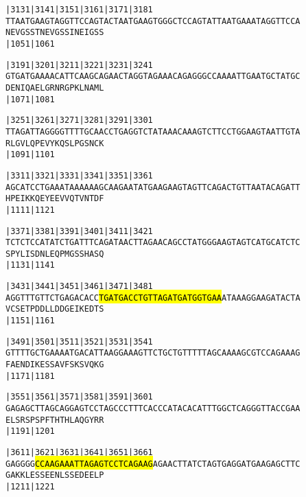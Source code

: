 \documentclass{article}
\begin{document}
\newpage
\begin{alltt}
|3131     |3141     |3151     |3161     |3171     |3181     
TTAATGAAGTAGGTTCCAGTACTAATGAAGTGGGCTCCAGTATTAATGAAATAGGTTCCA
  N  E  V  G  S  S  T  N  E  V  G  S  S  I  N  E  I  G  S  S
                    |1051                         |1061     

|3191     |3201     |3211     |3221     |3231     |3241     
GTGATGAAAACATTCAAGCAGAACTAGGTAGAAACAGAGGGCCAAAATTGAATGCTATGC
  D  E  N  I  Q  A  E  L  G  R  N  R  G  P  K  L  N  A  M  L
                    |1071                         |1081     

|3251     |3261     |3271     |3281     |3291     |3301     
TTAGATTAGGGGTTTTGCAACCTGAGGTCTATAAACAAAGTCTTCCTGGAAGTAATTGTA
  R  L  G  V  L  Q  P  E  V  Y  K  Q  S  L  P  G  S  N  C  K
                    |1091                         |1101     

|3311     |3321     |3331     |3341     |3351     |3361     
AGCATCCTGAAATAAAAAAGCAAGAATATGAAGAAGTAGTTCAGACTGTTAATACAGATT
  H  P  E  I  K  K  Q  E  Y  E  E  V  V  Q  T  V  N  T  D  F
                    |1111                         |1121     

|3371     |3381     |3391     |3401     |3411     |3421     
TCTCTCCATATCTGATTTCAGATAACTTAGAACAGCCTATGGGAAGTAGTCATGCATCTC
  S  P  Y  L  I  S  D  N  L  E  Q  P  M  G  S  S  H  A  S  Q
                    |1131                         |1141     

|3431     |3441     |3451     |3461     |3471     |3481     
AGGTTTGTTCTGAGACACC\hl{TGATGACCTGTTAGATGATGGTGAA}ATAAAGGAAGATACTA
  V  C  S  E  T  P  D  D  L  L  D  D  G  E  I  K  E  D  T  S
                    |1151                         |1161     

|3491     |3501     |3511     |3521     |3531     |3541     
GTTTTGCTGAAAATGACATTAAGGAAAGTTCTGCTGTTTTTAGCAAAAGCGTCCAGAAAG
  F  A  E  N  D  I  K  E  S  S  A  V  F  S  K  S  V  Q  K  G
                    |1171                         |1181     

|3551     |3561     |3571     |3581     |3591     |3601     
GAGAGCTTAGCAGGAGTCCTAGCCCTTTCACCCATACACATTTGGCTCAGGGTTACCGAA
  E  L  S  R  S  P  S  P  F  T  H  T  H  L  A  Q  G  Y  R  R
                    |1191                         |1201     

|3611     |3621     |3631     |3641     |3651     |3661     
GAGGGG\hl{CCAAGAAATTAGAGTCCTCAGAAG}AGAACTTATCTAGTGAGGATGAAGAGCTTC
  G  A  K  K  L  E  S  S  E  E  N  L  S  S  E  D  E  E  L  P
                    |1211                         |1221     

\end{alltt}
\end{document}
